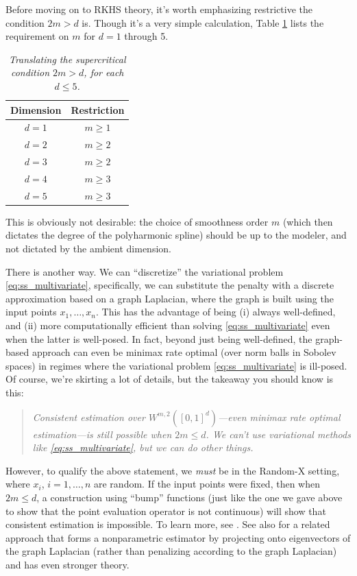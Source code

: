 \documentclass{article}
\begin{document}
Before moving on to RKHS theory, it's worth emphasizing restrictive the
condition $2m > d$ is. Though it's a very simple calculation, Table
\ref{tab:supercritical} lists the requirement on $m$ for $d=1$ through 5.  

\begin{table}[htb]
\centering
\begin{tabular}{c|c}
Dimension & Restriction \\
\hline
$d=1$ & $m \geq 1$ \\
$d=2$ & $m \geq 2$ \\
$d=3$ & $m \geq 2$ \\
$d=4$ & $m \geq 3$ \\
$d=5$ & $m \geq 3$ 
\end{tabular}
\caption{\it Translating the supercritical condition $2m > d$, for each $d 
  \leq 5$.} 
\label{tab:supercritical} 
\end{table}

This is obviously not desirable: the choice of smoothness order $m$ (which then
dictates the degree of the polyharmonic spline) should be up to the modeler, and
not dictated by the ambient dimension.

There is another way. We can ``discretize'' the variational problem
\eqref{eq:ss_multivariate}, specifically, we can substitute the penalty with a
discrete approximation based on a graph Laplacian, where the graph is built 
using the input points $x_1,\dots,x_n$. This has the advantage of being (i)
always well-defined, and (ii) more computationally efficient than solving
\eqref{eq:ss_multivariate} even when the latter is well-posed. In fact, beyond
just being well-defined, the graph-based approach can even be minimax rate
optimal (over norm balls in Sobolev spaces) in regimes where the variational
problem \eqref{eq:ss_multivariate} is ill-posed. Of course, we're skirting a lot
of details, but the takeaway you should know is this:  
\begin{quote}
\centering\it
Consistent estimation over $W^{m,2}([0,1]^d)$---even minimax rate optimal
estimation---is still possible when $2m \leq d$. We can't use variational
methods like \eqref{eq:ss_multivariate}, but we can do other things.
\end{quote}
However, to qualify the above statement, we \emph{must} be in the Random-X
setting, where $x_i$, $i=1,\dots,n$ are random. If the input points were fixed,
then when $2m \leq d$, a construction using ``bump'' functions (just like the
one we gave above to show that the point evaluation operator is not continuous)
will show that consistent estimation is impossible. To learn more, see 
\citet{green2021minimax1}. See also \citet{green2021minimax2} for a related
approach that forms a nonparametric estimator by projecting onto eigenvectors of 
the graph Laplacian (rather than penalizing according to the graph Laplacian)
and has even stronger theory.  
\end{document}
